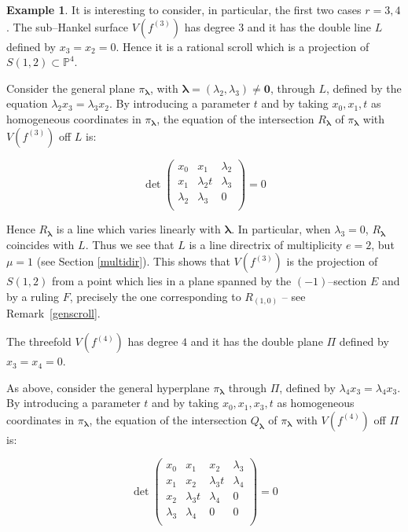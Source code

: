 \documentclass[11pt]{article}   %
\theoremstyle{definition}
\newtheorem{Example}[Theorem]{Example}
\numberwithin{Theorem}{section} \numberwithin{equation}{section}
\newcommand{\p}{{\mathbb P}}
\begin{document}
{{\begin{Example}\label{subhankel34} \rm It is interesting to consider,
in particular, the first two cases
$r=3,4$. The sub--Hankel surface $V(f^{(3)})$ has degree $3$ and it
has the double line $L$ defined by $x_3=x_2=0$. Hence it is a
rational scroll which is a projection of $S(1,2)\subset \p^ 4$.


Consider the general plane $\pi_{\mathbf{\lambda}}$, with
$\mathbf{\lambda}=(\lambda_2,\lambda_3)\neq \mathbf{0}$, through
$L$, defined by the equation $\lambda_2x_3=\lambda_3x_2$. By
introducing a parameter $t$ and by taking $x_0,x_1,t$ as homogeneous
coordinates in $\pi_\mathbf{\lambda}$, the equation of the
intersection $R_\mathbf{\lambda}$ of $\pi_\mathbf{\lambda}$ with
$V(f^{(3)})$ off $L$ is:


$$
\det \left(
\begin{matrix}
x_0&x_1&\lambda_2\\
x_1&\lambda_2t&\lambda_3\\
\lambda_2&\lambda_3 & 0\\
\end{matrix}
\right )=0
$$

Hence $R_\mathbf{\lambda}$ is a line which varies linearly with
$\mathbf{\lambda}$. In particular, when $\lambda_3=0$,
$R_\mathbf{\lambda}$ coincides with $L$. Thus we see that $L$ is a
line directrix of multiplicity $e=2$,   but
$\mu=1$ (see { Section}  \ref {multidir}). This shows that
$V(f^{(3)})$ is the projection of $S(1,2)$ from a point which lies
in a plane spanned by the $(-1)$--section $E$ and by a ruling $F$,
precisely the one corresponding to $R_{(1,0)}$ -- see
Remark~\ref{genscroll}.

The threefold $V(f^{(4)})$ has degree $4$ and it has the double
plane $\Pi$ defined by $x_3=x_4=0$.

As above, consider the general hyperplane $\pi_{\mathbf{\lambda}}$
through $\Pi$, defined by $\lambda_4x_3=\lambda_4x_3$. By
introducing a parameter $t$ and by taking $x_0,x_1,x_3,t$ as
homogeneous coordinates in $\pi_\mathbf{\lambda}$, the equation of
the intersection $Q_\mathbf{\lambda}$ of $\pi_\mathbf{\lambda}$ with
$V(f^{(4)})$ off $\Pi$ is:


$$
\det \left (
\begin{matrix}
x_0&x_1&x_2&\lambda_3\\
x_1&x_2&\lambda_3t&\lambda_4\\
x_2&\lambda_3t&\lambda_4&0\\
\lambda_3&\lambda_4&0&0\\
\end{matrix}
\right )=0
$$


\end{Example}}}
\end{document}
